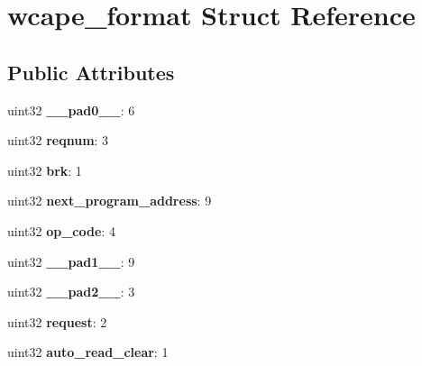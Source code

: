 \hypertarget{structwcape__format}{}\section{wcape\+\_\+format Struct Reference}
\label{structwcape__format}
\subsection*{Public Attributes}
\begin{DoxyCompactItemize}
\item 
\mbox{\label{structwcape__format_af139e4ca99f448f8ac8ef25a9602fdc7}} 
uint32 {\bfseries \+\_\+\+\_\+pad0\+\_\+\+\_\+}\+: 6
\item 
\mbox{\label{structwcape__format_abe7df251c4a6199b7e345d83a3be40a2}} 
uint32 {\bfseries reqnum}\+: 3
\item 
\mbox{\label{structwcape__format_a9a60d3dd0c46fc07e68dad916935b313}} 
uint32 {\bfseries brk}\+: 1
\item 
\mbox{\label{structwcape__format_a95f25146955b1d7b5cbd54aaa339c2de}} 
uint32 {\bfseries next\+\_\+program\+\_\+address}\+: 9
\item 
\mbox{\label{structwcape__format_a43f64e9f85e65fc284bc31560c26fa88}} 
uint32 {\bfseries op\+\_\+code}\+: 4
\item 
\mbox{\label{structwcape__format_a54c764bbed7eb5a59ebbfe87c55847b3}} 
uint32 {\bfseries \+\_\+\+\_\+pad1\+\_\+\+\_\+}\+: 9
\item 
\mbox{\label{structwcape__format_af39dffe4cdff933159c3bda28bbf418c}} 
uint32 {\bfseries \+\_\+\+\_\+pad2\+\_\+\+\_\+}\+: 3
\item 
\mbox{\label{structwcape__format_a2508e318bcdc41ceae273762fc24633f}} 
uint32 {\bfseries request}\+: 2
\item 
\mbox{\label{structwcape__format_a744b541192e167db558315ea6fb094b0}} 
uint32 {\bfseries auto\+\_\+read\+\_\+clear}\+: 1

\end{DoxyCompactItemize}
